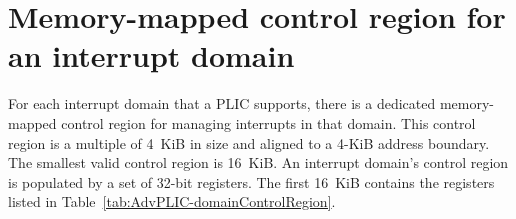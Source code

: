 \section{Memory-mapped control region for an interrupt domain}
\label{sec:AdvPLIC-domainControlRegion}

For each interrupt domain that a PLIC supports, there is a dedicated
memory-mapped control region for managing interrupts in that domain.
This control region is a multiple of 4~KiB in size and aligned to a
\mbox{4-KiB} address boundary.
The smallest valid control region is 16~KiB.
An interrupt domain's control region is populated by a set of
\mbox{32-bit} registers.
The first 16~KiB contains the registers listed in
Table~\ref{tab:AdvPLIC-domainControlRegion}.

